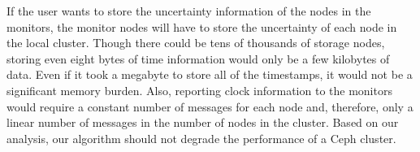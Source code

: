 If the user wants to store the uncertainty information of the nodes in
the monitors, the monitor nodes will have to store the uncertainty of
each node in the local cluster. Though there could be tens of
thousands of storage nodes, storing even eight bytes of time
information would only be a few kilobytes of data. Even if it
took a megabyte to store all of the timestamps, it would not be a
significant memory burden. Also, reporting clock information to the
monitors would require a constant number of messages for each node
and, therefore, only a linear number of messages in the number of
nodes in the cluster.  Based on our analysis, our algorithm should not
degrade the performance of a Ceph cluster.

